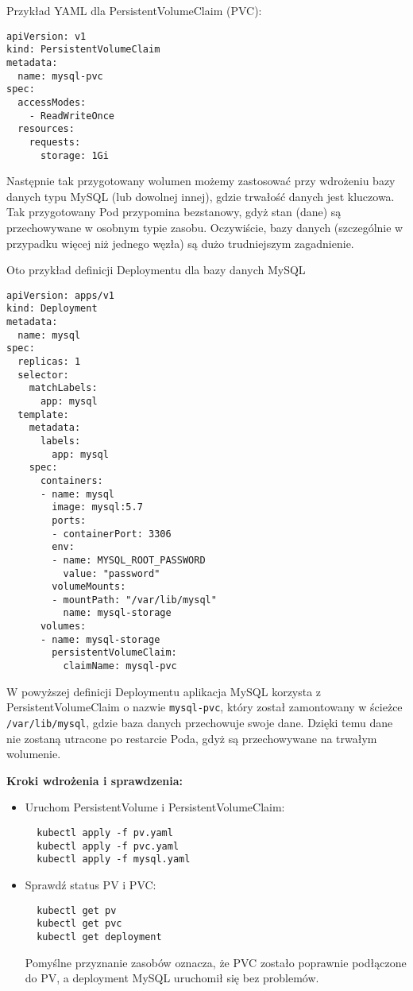 \documentclass{article}
\begin{document}
Przykład YAML dla PersistentVolumeClaim (PVC):
\begin{lstlisting}
apiVersion: v1
kind: PersistentVolumeClaim
metadata:
  name: mysql-pvc
spec:
  accessModes:
    - ReadWriteOnce
  resources:
    requests:
      storage: 1Gi
\end{lstlisting}

Następnie tak przygotowany wolumen możemy zastosować przy wdrożeniu bazy danych typu MySQL (lub dowolnej innej), gdzie trwałość danych jest kluczowa. Tak przygotowany Pod przypomina bezstanowy, gdyż stan (dane) są przechowywane w osobnym typie zasobu. Oczywiście, bazy danych (szczególnie w przypadku więcej niż jednego węzła) są dużo trudniejszym zagadnienie.

Oto przykład definicji Deploymentu dla bazy danych MySQL

\begin{lstlisting}
apiVersion: apps/v1
kind: Deployment
metadata:
  name: mysql
spec:
  replicas: 1
  selector:
    matchLabels:
      app: mysql
  template:
    metadata:
      labels:
        app: mysql
    spec:
      containers:
      - name: mysql
        image: mysql:5.7
        ports:
        - containerPort: 3306
        env:
        - name: MYSQL_ROOT_PASSWORD
          value: "password"
        volumeMounts:
        - mountPath: "/var/lib/mysql"
          name: mysql-storage
      volumes:
      - name: mysql-storage
        persistentVolumeClaim:
          claimName: mysql-pvc
\end{lstlisting}

W powyższej definicji Deploymentu aplikacja MySQL korzysta z PersistentVolumeClaim o nazwie \texttt{mysql-pvc}, który został zamontowany w ścieżce \texttt{/var/lib/mysql}, gdzie baza danych przechowuje swoje dane. Dzięki temu dane nie zostaną utracone po restarcie Poda, gdyż są przechowywane na trwałym wolumenie.

\textbf{Kroki wdrożenia i sprawdzenia:}
\begin{itemize}
  \item Uruchom PersistentVolume i PersistentVolumeClaim:
  \begin{lstlisting}
  kubectl apply -f pv.yaml
  kubectl apply -f pvc.yaml
  kubectl apply -f mysql.yaml
  \end{lstlisting}
  \item Sprawdź status PV i PVC:
  \begin{lstlisting}
  kubectl get pv
  kubectl get pvc
  kubectl get deployment
  \end{lstlisting}
  Pomyślne przyznanie zasobów oznacza, że PVC zostało poprawnie podłączone do PV, a deployment MySQL uruchomił się bez problemów.
\end{itemize}
\end{document}
